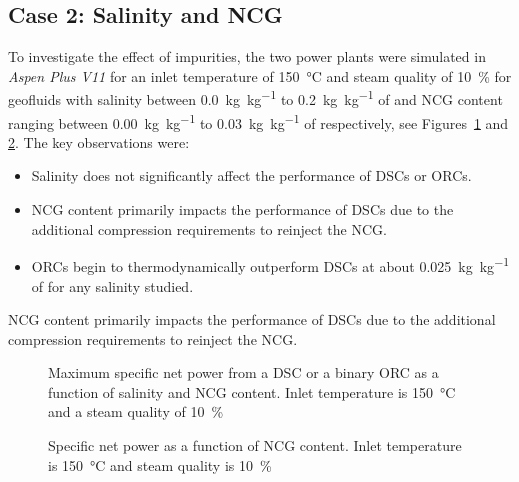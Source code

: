 \subsection{Case 2: Salinity and NCG} %
    To investigate the effect of impurities, the two power plants were simulated in \emph{Aspen Plus V11} for an inlet temperature of \qty{150}{\degreeCelsius} and steam quality of \qty{10}{\percent} for geofluids with salinity between \qty{0.0}{\kg\per\kg} to \qty{0.2}{\kg\per\kg} of  and \ac{NCG} content ranging between \qty{0.00}{\kg\per\kg} to \qty{0.03}{\kg\per\kg} of  respectively, see Figures~\ref{fig:prosim_aspen_NCGSal_map} and \ref{fig:prosim_aspen_NCGSlice}. The key observations were:
    \begin{itemize}
        \item Salinity does not significantly affect the performance of \ac{DSC}s or \ac{ORC}s.
        \item \ac{NCG} content primarily impacts the performance of \ac{DSC}s due to the additional compression requirements to reinject the \ac{NCG}.
        \item \ac{ORC}s begin to thermodynamically outperform \ac{DSC}s at about \qty{0.025}{\kg\per\kg} of  for any salinity studied.
    \end{itemize}
	
    \ac{NCG} content primarily impacts the performance of \ac{DSC}s due to the additional compression requirements to reinject the \ac{NCG}.
	
    \begin{figure}[H]
        \centering
        \resizebox{!}{8cm}{}
        \caption[Maximum specific net power from a \ac{DSC} or a binary \ac{ORC} as a function of salinity and \ac{NCG} content.]{Maximum specific net power from a \ac{DSC} or a binary \ac{ORC} as a function of salinity and \ac{NCG} content. Inlet temperature is \qty{150}{\degreeCelsius} and a steam quality of \qty{10}{\percent}}
        \label{fig:prosim_aspen_NCGSal_map}
    \end{figure}

    \begin{figure}[H]
        \centering
        
        \caption[Specific net power as a function of \ac{NCG} content.]{Specific net power as a function of \ac{NCG} content. Inlet temperature is \qty{150}{\degreeCelsius} and steam quality is \qty{10}{\percent}}
        \label{fig:prosim_aspen_NCGSlice}
    \end{figure}

